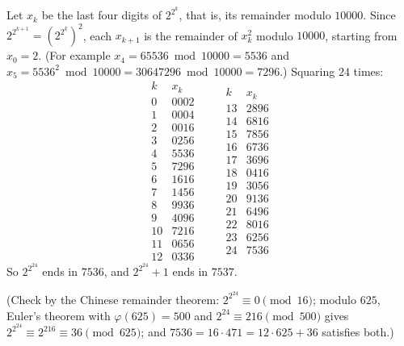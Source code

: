 Let $x_k$ be the last four digits of $2^{2^k}$, that is, its remainder modulo $10000$. Since $2^{2^{k+1}}=\left(2^{2^k}\right)^2$, each $x_{k+1}$ is the remainder of $x_k^2$ modulo $10000$, starting from $x_0=2$. (For example $x_4=65536\bmod 10000=5536$ and $x_5=5536^2\bmod10000=30647296\bmod10000=7296$.) Squaring $24$ times:
\[
\begin{array}{c|c}
k & x_k\\\hline
0 & 0002\\
1 & 0004\\
2 & 0016\\
3 & 0256\\
4 & 5536\\
5 & 7296\\
6 & 1616\\
7 & 1456\\
8 & 9936\\
9 & 4096\\
10 & 7216\\
11 & 0656\\
12 & 0336
\end{array}\qquad
\begin{array}{c|c}
k & x_k\\\hline
13 & 2896\\
14 & 6816\\
15 & 7856\\
16 & 6736\\
17 & 3696\\
18 & 0416\\
19 & 3056\\
20 & 9136\\
21 & 6496\\
22 & 8016\\
23 & 6256\\
24 & 7536
\end{array}
\]
So $2^{2^{24}}$ ends in $7536$, and $2^{2^{24}}+1$ ends in $\boxed{7537}$.

(Check by the Chinese remainder theorem: $2^{2^{24}}\equiv0\pmod{16}$; modulo $625$, Euler's theorem with $\varphi(625)=500$ and $2^{24}\equiv216\pmod{500}$ gives $2^{2^{24}}\equiv2^{216}\equiv36\pmod{625}$; and $7536=16\cdot471=12\cdot625+36$ satisfies both.)
